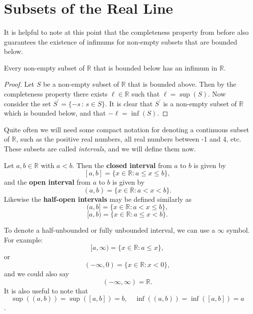 \documentclass[../real_analysis.tex]{subfiles}
\begin{document}
    \section{Subsets of the Real Line}
        \paragraph{}
        It is helpful to note at this point that the completeness property from before also guarantees the existence of infimums for non-empty subsets that are bounded below.
        \begin{theorem}
            Every non-empty subset of $\mathbb{R}$ that is bounded below has an infimum in $\mathbb{R}$.
        \end{theorem}
        \begin{proof}
            Let $S$ be a non-empty subset of $\mathbb{R}$ that is bounded above. Then by the completeness property there exists $\ell\in\mathbb{R}$ such that $\ell=\sup(S)$.
            Now consider the set $S^\prime=\{-s\,:\,s\in S\}$. It is clear that $S^\prime$ is a non-empty subset of $\mathbb{R}$ which is bounded below, and that $-\ell=\inf(S)$.
        \end{proof}
        Quite often we will need some compact notation for denoting a continuous subset of $\mathbb{R}$, such as the positive real numbers, all real numbers between -1 and 4, etc. These subsets are called \textit{intervals}, and we will define them now.
        \begin{definition}
            Let $a, b \in \mathbb{R}$ with $a<b$. Then the \textbf{closed interval} from $a$ to $b$ is given by
            \[[a, b] = \{x \in \mathbb{R} : a \leq x \leq b\},\]
            and the \textbf{open interval} from $a$ to $b$ is given by
            \[(a, b) = \{x \in \mathbb{R} : a < x < b\}.\]
            Likewise the \textbf{half-open intervals} may be defined similarly as
            \[(a, b] = \{x \in \mathbb{R} : a < x \leq b\},\]
            \[[a, b) = \{x \in \mathbb{R} : a \leq x < b\}.\]
        \end{definition}
        To denote a half-unbounded or fully unbounded interval, we can use a $\infty$ symbol. For example:
        \[[a, \infty) = \{x \in \mathbb{R} : a \leq x\},\]
        or
        \[(-\infty, 0) = \{x \in \mathbb{R} : x < 0\},\]
        and we could also say
        \[(-\infty, \infty) = \mathbb{R}.\]
        It is also useful to note that
        \[\sup((a, b))=\sup([a, b])=b,\quad\inf((a, b))=\inf([a, b])=a\].
\end{document}
